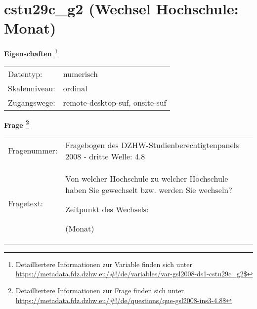 
    \setcounter{footnote}{0}

    \vspace*{-1.8cm}
	\section{cstu29c\_g2 (Wechsel Hochschule: Monat)}
	\label{section:cstu29c_g2}



    \vspace*{0.5cm}
    \noindent\textbf{Eigenschaften
	\footnote{Detailliertere Informationen zur Variable finden sich unter
		\url{https://metadata.fdz.dzhw.eu/\#!/de/variables/var-gsl2008-ds1-cstu29c_g2$}}}\\
	\begin{tabularx}{\hsize}{@{}lX}
	Datentyp: & numerisch \\
	Skalenniveau: & ordinal \\
	Zugangswege: &
	  remote-desktop-suf, 
	  onsite-suf
 \\
    \end{tabularx}



				\vspace*{0.5cm}
                \noindent\textbf{Frage
	                \footnote{Detailliertere Informationen zur Frage finden sich unter
		              \url{https://metadata.fdz.dzhw.eu/\#!/de/questions/que-gsl2008-ins3-4.8$}}}\\
				\begin{tabularx}{\hsize}{@{}lX}
					Fragenummer: &
					  Fragebogen des DZHW-Studienberechtigtenpanels 2008 - dritte Welle:
					  4.8
 \\
					Fragetext: & Von welcher Hochschule zu welcher Hochschule haben Sie gewechselt bzw. werden Sie wechseln?\par  Zeitpunkt des Wechsels:\par  (Monat) \\
				\end{tabularx}





